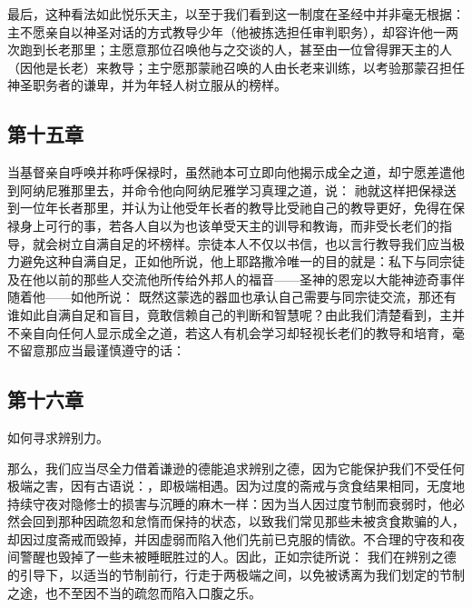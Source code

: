 \par

最后，这种看法如此悦乐天主，以至于我们看到这一制度在圣经中并非毫无根据：主不愿亲自以神圣对话的方式教导少年（他被拣选担任审判职务），却容许他一两次跑到长老那里；主愿意那位召唤他与之交谈的人，甚至由一位曾得罪天主的人（因他是长老）来教导；主宁愿那蒙祂召唤的人由长老来训练，以考验那蒙召担任神圣职务者的谦卑，并为年轻人树立服从的榜样。\par


\subsection{第十五章}

\par

当基督亲自呼唤并称呼保禄时，虽然祂本可立即向他揭示成全之道，却宁愿差遣他到阿纳尼雅那里去，并命令他向阿纳尼雅学习真理之道，说：  祂就这样把保禄送到一位年长者那里，并认为让他受年长者的教导比受祂自己的教导更好，免得在保禄身上可行的事，若各人自以为也该单受天主的训导和教诲，而非受长老们的指导，就会树立自满自足的坏榜样。宗徒本人不仅以书信，也以言行教导我们应当极力避免这种自满自足，正如他所说，他上耶路撒冷唯一的目的就是：私下与同宗徒及在他以前的那些人交流他所传给外邦人的福音——圣神的恩宠以大能神迹奇事伴随着他——如他所说：  既然这蒙选的器皿也承认自己需要与同宗徒交流，那还有谁如此自满自足和盲目，竟敢信赖自己的判断和智慧呢？由此我们清楚看到，主并不亲自向任何人显示成全之道，若这人有机会学习却轻视长老们的教导和培育，毫不留意那应当最谨慎遵守的话： \par


\subsection{第十六章}

如何寻求辨别力。\par

那么，我们应当尽全力借着谦逊的德能追求辨别之德，因为它能保护我们不受任何极端之害，因有古语说：，即极端相遇。因为过度的斋戒与贪食结果相同，无度地持续守夜对隐修士的损害与沉睡的麻木一样：因为当人因过度节制而衰弱时，他必然会回到那种因疏忽和怠惰而保持的状态，以致我们常见那些未被贪食欺骗的人，却因过度斋戒而毁掉，并因虚弱而陷入他们先前已克服的情欲。不合理的守夜和夜间警醒也毁掉了一些未被睡眠胜过的人。因此，正如宗徒所说：  我们在辨别之德的引导下，以适当的节制前行，行走于两极端之间，以免被诱离为我们划定的节制之途，也不至因不当的疏忽而陷入口腹之乐。\par

